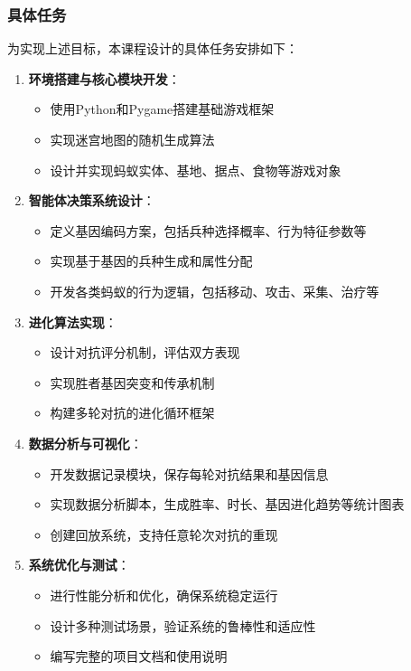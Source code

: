 \documentclass[12pt,a4paper]{article}
\begin{document}
	\subsubsection{具体任务}
	为实现上述目标，本课程设计的具体任务安排如下：
	\begin{enumerate}
		\item \textbf{环境搭建与核心模块开发}：
		\begin{itemize}
			\item 使用Python和Pygame搭建基础游戏框架
			\item 实现迷宫地图的随机生成算法
			\item 设计并实现蚂蚁实体、基地、据点、食物等游戏对象
		\end{itemize}
		
		\item \textbf{智能体决策系统设计}：
		\begin{itemize}
			\item 定义基因编码方案，包括兵种选择概率、行为特征参数等
			\item 实现基于基因的兵种生成和属性分配
			\item 开发各类蚂蚁的行为逻辑，包括移动、攻击、采集、治疗等
		\end{itemize}
		
		\item \textbf{进化算法实现}：
		\begin{itemize}
			\item 设计对抗评分机制，评估双方表现
			\item 实现胜者基因突变和传承机制
			\item 构建多轮对抗的进化循环框架
		\end{itemize}
		
		\item \textbf{数据分析与可视化}：
		\begin{itemize}
			\item 开发数据记录模块，保存每轮对抗结果和基因信息
			\item 实现数据分析脚本，生成胜率、时长、基因进化趋势等统计图表
			\item 创建回放系统，支持任意轮次对抗的重现
		\end{itemize}
		
		\item \textbf{系统优化与测试}：
		\begin{itemize}
			\item 进行性能分析和优化，确保系统稳定运行
			\item 设计多种测试场景，验证系统的鲁棒性和适应性
			\item 编写完整的项目文档和使用说明
		\end{itemize}
	\end{enumerate}
	
\end{document}
